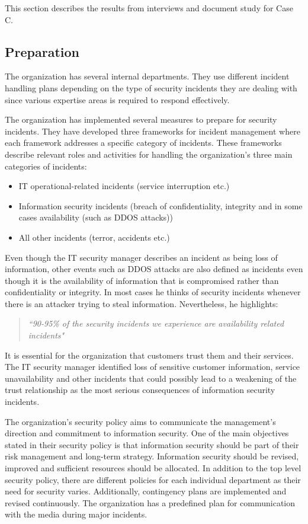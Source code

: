 This section describes the results from interviews and document study for Case C.

\subsection{Preparation}
The organization has several internal departments. They use different incident handling plans depending on the type of security incidents they are dealing with since various expertise areas is required to respond effectively. 

The organization has implemented several measures to prepare for security incidents. They have developed three frameworks for incident management where each framework addresses a specific category of incidents. These frameworks describe relevant roles and activities for handling the organization's three main categories of incidents:

\begin{itemize}
\item IT operational-related incidents (service interruption etc.)
\item Information security incidents (breach of confidentiality, integrity and in some cases availability (such as DDOS attacks))
\item All other incidents (terror, accidents etc.)
\end{itemize}
 
Even though the IT security manager describes an incident as being loss of information, other events such as DDOS attacks are also defined as incidents even though it is the availability of information that is compromised rather than confidentiality or integrity. In most cases he thinks of security incidents whenever there is an attacker trying to steal information. Nevertheless, he highlights:

\begin{quote}
\textit{``90-95\% of the security incidents we experience are availability related incidents"}
\end{quote} 
 
It is essential for the organization that customers trust them and their services. The IT security manager identified loss of sensitive customer information, service unavailability and other incidents that could possibly lead to a weakening of the trust relationship as the most serious consequences of information security incidents. 

The organization's security policy aims to communicate the management's direction and commitment to information security. One of the main objectives stated in their security policy is that information security should be part of their risk management and long-term strategy. Information security should be revised, improved and sufficient resources should be allocated. In addition to the top level security policy, there are different policies for each individual department as their need for security varies. Additionally, contingency plans are implemented and revised continuously. The organization has a predefined plan for communication with the media during major incidents. 

